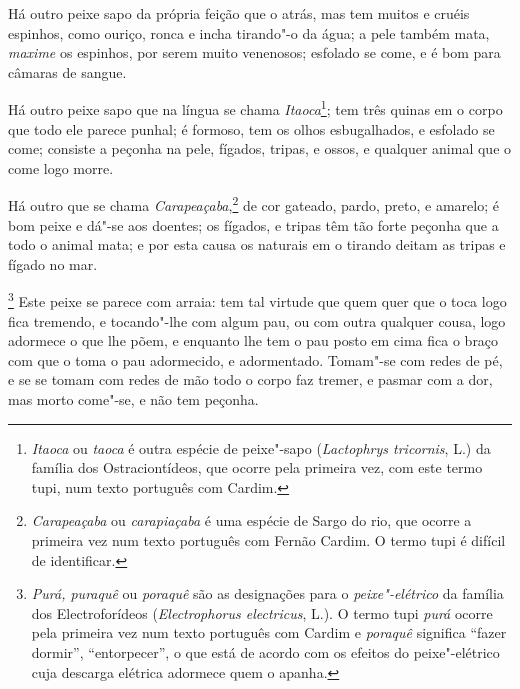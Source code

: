 Há outro peixe sapo da própria feição que o atrás, mas tem muitos e
cruéis espinhos, como ouriço, ronca e incha tirando"-o da água; a pele
também mata, \textit{maxime} os espinhos, por serem muito venenosos; esfolado se
come, e é bom para câmaras de sangue.

 Há outro peixe sapo que na língua se chama 
 \textit{Itaoca}\footnote{ \textit{Itaoca} ou \textit{taoca} é outra espécie de peixe"-sapo
(\textit{Lactophrys tricornis}, L.) da família dos Ostraciontídeos, que
ocorre pela primeira vez, com este termo tupi, num texto português com
Cardim.}; tem três quinas em o corpo que todo ele parece punhal; é
formoso, tem os olhos esbugalhados, e esfolado se come; consiste a
peçonha na pele, fígados, tripas, e ossos, e qualquer animal que o come
logo morre.

 Há outro que se chama \textit{Carapeaçaba},\footnote{ \textit{Carapeaçaba} 
ou \textit{carapiaçaba} é uma espécie de Sargo
do rio, que ocorre a primeira vez num texto português com Fernão
Cardim. O termo tupi é difícil de identificar.} de cor gateado, pardo,
preto, e amarelo; é bom peixe e dá"-se aos doentes; os fígados, e tripas
têm tão forte peçonha que a todo o animal mata; e por esta causa os
naturais em o tirando deitam as tripas e fígado no mar.

\footnote{ \textit{Purá, puraquê} ou
\textit{poraquê} são as designações para o \textit{peixe"-elétrico}
da família dos Electroforídeos (\textit{Electrophorus electricus}, L.).
O termo tupi \textit{purá} ocorre pela primeira vez num texto
português com Cardim e \textit{poraquê} significa ``fazer dormir'',
``entorpecer'', o que está de acordo com os efeitos do peixe"-elétrico
cuja descarga elétrica adormece quem o apanha.} Este peixe
se parece com arraia: tem tal virtude que quem quer que o toca logo
fica tremendo, e tocando"-lhe com algum pau, ou com outra qualquer
cousa, logo adormece o que lhe põem, e enquanto lhe tem o pau posto em
cima fica o braço com que o toma o pau adormecido, e adormentado.
Tomam"-se com redes de pé, e se se tomam com redes de mão todo o corpo
faz tremer, e pasmar com a dor, mas morto come"-se, e não tem peçonha.

